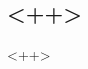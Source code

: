 \documentclass[a4paper]{article}
\begin{document}
	\csmalltitle{<++>}
	
	\begin{abstract}
		<++>
	\end{abstract}
	
	\begin{multicols}{2}
	\section{<++>}
		<++>

	\end{multicols}
\end{document}
